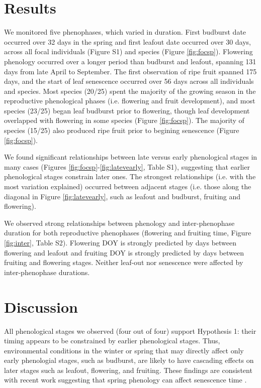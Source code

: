 \documentclass{article}
\begin{document}
\section* {Results}
\par We monitored five phenophases, which varied in duration. First budburst date occurred over 32 days in the spring and first leafout date occurred over 30 days, across all focal individuals (Figure S1) and species (Figure \ref{fig:focsp}). Flowering phenology occurred over a longer period than budburst and leafout, spanning 131 days from late April to September. The first observation of ripe fruit spanned 175 days, and the start of leaf senescence occurred over 56 days across all individuals and species. 
Most species (20/25) spent the majority of the growing season in the reproductive phenological phases (i.e. flowering and fruit development), and most species (23/25) began leaf budburst prior to flowering, though leaf development overlapped with flowering in some species (Figure \ref{fig:focsp}). The majority of species (15/25) also produced ripe fruit prior to begining senescence (Figure \ref{fig:focsp}).
\par We found significant relationships between late versus early phenological stages in many cases (Figures \ref{fig:focsp}-\ref{fig:latevearly}, Table S1), suggesting that earlier phenological stages constrain later ones. The strongest relationships (i.e. with the most variation explained) occurred between adjacent stages (i.e. those along the diagonal in Figure \ref{fig:latevearly}, such as leafout and budburst, fruiting and flowering). 

\par We observed strong relationships between phenology and inter-phenophase duration for both reproductive phenophases (flowering and fruiting time, Figure \ref{fig:inter}, Table S2). Flowering DOY is strongly predicted by days between flowering and leafout and fruiting DOY is strongly predicted by days between fruiting and flowering stages. Neither leaf-out nor senescence were affected by inter-phenophase durations.

\section* {Discussion}
\par All phenological stages we observed (four out of four) support Hypothesis 1: their timing appears to be constrained by earlier phenological stages. Thus, environmental conditions in the winter or spring that may directly affect only early phenologial stages, such as budburst, are likely to have cascading effects on later stages such as leafout, flowering, and fruiting. These findings are consistent with recent work suggesting that spring phenology can affect senescence time \citep {keenan2015}.
\end{document}
